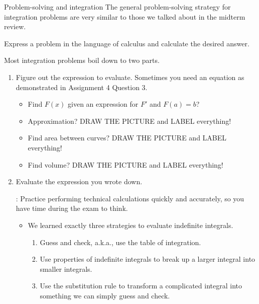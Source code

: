 \documentclass[../main.tex]{subfiles}
\begin{document}
\begin{lesson}{Problem-solving and integration}
  The general problem-solving strategy for integration problems are very similar to those we talked about in the midterm review.

  \begin{mdframed}[style=simple]
    Express a problem in the language of calculus and calculate the desired answer. 
  \end{mdframed}

  Most integration problems boil down to two parts.
  \begin{enumerate}[wide, label=\textbf{Part~\arabic*}.]
    \item Figure out the  expression to evaluate. Sometimes you need an equation as demonstrated in Assignment 4 Question 3.

      \begin{itemize}[wide]
        \item Find \(F(x)\) given an expression for \(F'\) and \(F(a) = b\)?

        \item Approximation?  DRAW THE PICTURE and LABEL everything!

        \item Find area between curves?  DRAW THE PICTURE and LABEL everything!

        \item Find volume?  DRAW THE PICTURE and LABEL everything!

      \end{itemize}

    \item Evaluate the expression you wrote down. 

      : Practice performing technical calculations quickly and accurately, so you have time during the exam to think.

      \begin{itemize}
        \item We learned exactly three strategies to evaluate indefinite integrals.

        \begin{enumerate}
          \item Guess and check, a.k.a., use the table of integration. 
          \item Use properties of indefinite integrals to break up a larger integral into smaller integrals. 
          \item Use the substitution rule to transform a complicated integral into something we can simply guess and check.
        \end{enumerate}


\end{itemize}
\end{enumerate}
\end{lesson}
\end{document}
